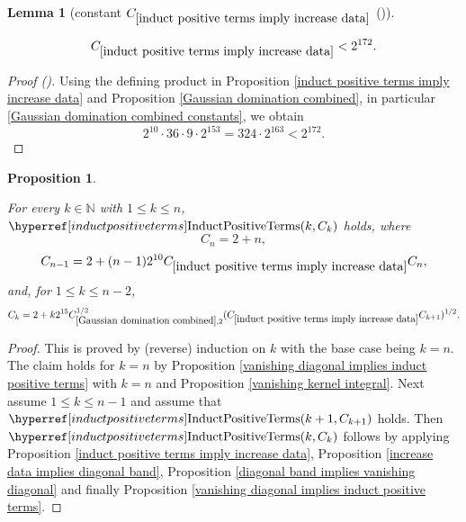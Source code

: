 \documentclass[12pt,reqno]{amsart}
\newcommand{\auto}{{({\tiny\faCar})}}
\theoremstyle{plain}
\newtheorem{lemma}[theorem]{Lemma}
\newtheorem{proposition}[theorem]{Proposition}
\numberwithin{equation}{section}
\theoremstyle{remark}
\newcommand{\uses}[1]{}
\newcommand{\usesdefs}[1]{}
\newcommand{\leanok}{}
\newcommand{\lean}[1]{}
\newcommand{\N}{{\mathbb N}}
\begin{document}
\begin{lemma}[constant $C_{\ref{induct positive terms imply increase data}}$ \auto]\label{constant induct positive terms imply increase data}\uses{Gaussian domination combined,induct positive terms imply increase data}\usesdefs{}
\lean{Auto.constantInductPositiveTermsImplyIncreaseData}
\leanok
\begin{equation}\label{constant induct positive terms imply increase data bound}
C_{\ref{induct positive terms imply increase data}}<2^{172}.
\end{equation}
\end{lemma}
\begin{proof}[Proof \auto]
Using the defining product in Proposition \ref{induct positive terms imply increase data} and Proposition \ref{Gaussian domination combined}, in particular \eqref{Gaussian domination combined constants}, we obtain
\[
2^{10}\cdot36\cdot9\cdot2^{153}
=324\cdot2^{163}<2^{172}.
\]
\end{proof}


\begin{proposition}\label{P:C_k-induction}\uses{vanishing diagonal implies induct positive terms,vanishing kernel integral,induct positive terms imply increase data,increase data implies diagonal band,diagonal band implies vanishing diagonal}\usesdefs{induct positive terms}
\lean{Auto.inductPositiveTermsByInduction}
\leanok
For every $k\in\N$ with $1\le k\le n$, $\InductPositiveTerms{k,C_k}$ holds, where
\begin{equation}\label{auto:positive-induction-recursion}
C_n=2+n,
\end{equation}
\begin{equation}\label{auto:positive-induction-recursion-terminal-step}
C_{n-1}=2+(n-1)2^{10}C_{\ref{induct positive terms imply increase data}}C_n,
\end{equation}
and, for $1\le k\le n-2$,
\begin{equation}\label{auto:positive-induction-recursion-interior-step}
C_k=2+k2^{15}C_{\ref{Gaussian domination combined},2}^{1/2}
(C_{\ref{induct positive terms imply increase data}}C_{k+1})^{1/2}.
\end{equation}
\end{proposition}

\begin{proof}
This is proved by (reverse) induction on $k$ with the base case being $k=n$.
The claim holds for $k=n$ by Proposition \ref{vanishing diagonal implies induct positive terms} with $k=n$ and Proposition \ref{vanishing kernel integral}.
Next assume $1\le k\le n-1$ and assume that $\InductPositiveTerms{k+1,C_{k+1}}$ holds.
Then $\InductPositiveTerms{k,C_k}$
follows by applying Proposition \ref{induct positive terms imply increase data}, Proposition \ref{increase data implies diagonal band}, Proposition \ref{diagonal band implies vanishing diagonal} and finally Proposition \ref{vanishing diagonal implies induct positive terms}.
\end{proof}
\end{document}
